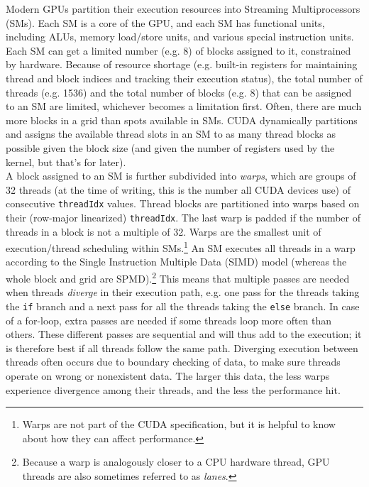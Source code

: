 \documentclass[table, xcdraw]{article}%
\begin{document}
Modern GPUs partition their execution resources into Streaming Multiprocessors (SMs). Each SM is a core of the GPU, and each SM has functional units, including ALUs, memory load/store units, and various special instruction units. Each SM can get a limited number (e.g. 8) of blocks assigned to it, constrained by hardware. Because of resource shortage (e.g. built-in registers for maintaining thread and block indices and tracking their execution status), the total number of threads (e.g. 1536) and the total number of blocks (e.g. 8) that can be assigned to an SM are limited, whichever becomes a limitation first. Often, there are much more blocks in a grid than spots available in SMs. CUDA dynamically partitions and assigns the available thread slots in an SM to as many thread blocks as possible given the block size (and given the number of registers used by the kernel, but that's for later).\\
A block assigned to an SM is further subdivided into \emph{warps}, which are groups of 32 threads (at the time of writing, this is the number all CUDA devices use) of consecutive \texttt{threadIdx} values. Thread blocks are partitioned into warps based on their (row-major linearized) \texttt{threadIdx}. The last warp is padded if the number of threads in a block is not a multiple of 32. Warps are the smallest unit of execution/thread scheduling within SMs.\footnote{Warps are not part of the CUDA specification, but it is helpful to know about how they can affect performance.} An SM executes all threads in a warp according to the Single Instruction Multiple Data (SIMD) model (whereas the whole block and grid are SPMD).\footnote{Because a warp is analogously closer to a CPU hardware thread, GPU threads are also sometimes referred to as \emph{lanes}.} This means that multiple passes are needed when threads \emph{diverge} in their execution path, e.g. one pass for the threads taking the \texttt{if} branch and a next pass for all the threads taking the \texttt{else} branch. In case of a for-loop, extra passes are needed if some threads loop more often than others. These different passes are sequential and will thus add to the execution; it is therefore best if all threads follow the same path. Diverging execution between threads often occurs due to boundary checking of data, to make sure threads operate on wrong or nonexistent data. The larger this data, the less warps experience divergence among their threads, and the less the performance hit.\\
\end{document}
